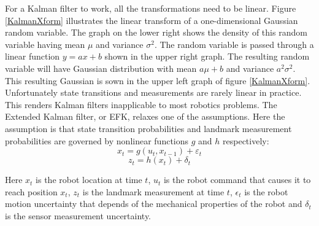 \documentclass[conference]{IEEEtran}
\begin{document}
For a Kalman filter to work, all the transformations need to be linear. Figure \ref{KalmanXform} illustrates the linear transform of a one-dimensional Gaussian random variable. The graph on the lower right shows the density of this random variable having mean $\mu$ and variance $\sigma^2$. The random variable is passed through a linear function $y=ax+b$ shown in the upper right graph. The resulting random variable will have Gaussian distribution with mean $a\mu + b$ and variance $a^2\sigma^2$. This resulting Gaussian is sown in the upper left graph of figure \ref{KalmanXform}.\\

Unfortunately state transitions and measurements are rarely linear in practice\cite{thrun}. This renders Kalman filters inapplicable to most robotics problems. The Extended Kalman filter, or EFK, relaxes one of the assumptions. Here the assumption is that state transition probabilities and landmark measurement probabilities are governed by nonlinear functions $g$ and $h$ respectively:
\begin{equation}\label{transition}
x_{t} = g(u_{t}, x_{t-1}) + \varepsilon_{t}
\end{equation}
\begin{equation}\label{measurement}
z_{t} = h(x_{t}) + \delta_{t}
\end{equation}

Here $x_{t}$ is the robot location at time $t$, $u_{t}$ is the robot command that causes it to reach position $x_{t}$, $z_{t}$ is the landmark measurement at time $t$, $\epsilon_{t}$ is the robot motion uncertainty that depends of the mechanical properties of the robot and $\delta_{t}$ is the sensor measurement uncertainty. \\
\end{document}
